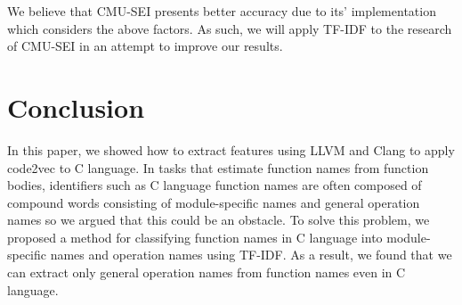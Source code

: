 \documentclass[JIP]{apris}
\begin{document}

We believe that CMU-SEI presents better accuracy due to its' implementation which considers the above factors.
As such, we will apply TF-IDF to the research of CMU-SEI in an attempt to improve our results.


\section{Conclusion}
In this paper, we showed how to extract features using LLVM and Clang to apply code2vec to C language.
In tasks that estimate function names from function bodies, identifiers such as C language function names are often composed of compound words consisting of module-specific names and general operation names so we argued that this could be an obstacle.
To solve this problem, we proposed a method for classifying function names in C language into module-specific names and operation names using TF-IDF.
As a result, we found that we can extract only general operation names from function names even in C language.
\end{document}
